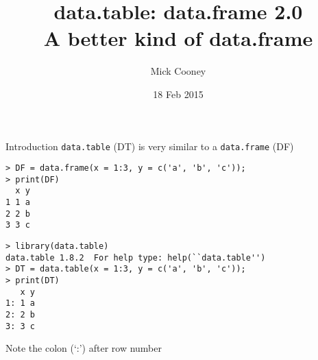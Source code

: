 \documentclass[12pt]{beamer}
\title[data.table: data.frame 2.0]{data.table: data.frame 2.0\\A better kind of data.frame}
\author{Mick Cooney}
\date{18 Feb 2015}
\begin{document}
\begin{frame}
\titlepage
\end{frame}



\begin{frame}[fragile]{Introduction}
\texttt{data.table} (DT) is very similar to a \texttt{data.frame} (DF)

\pause
\begin{verbatim}
> DF = data.frame(x = 1:3, y = c('a', 'b', 'c'));
> print(DF)
  x y
1 1 a
2 2 b
3 3 c
\end{verbatim}

\begin{verbatim}
> library(data.table)
data.table 1.8.2  For help type: help(``data.table'')
> DT = data.table(x = 1:3, y = c('a', 'b', 'c'));
> print(DT)
   x y
1: 1 a
2: 2 b
3: 3 c
\end{verbatim}

\pause Note the colon (`:') after row number

\end{frame}
\end{document}
